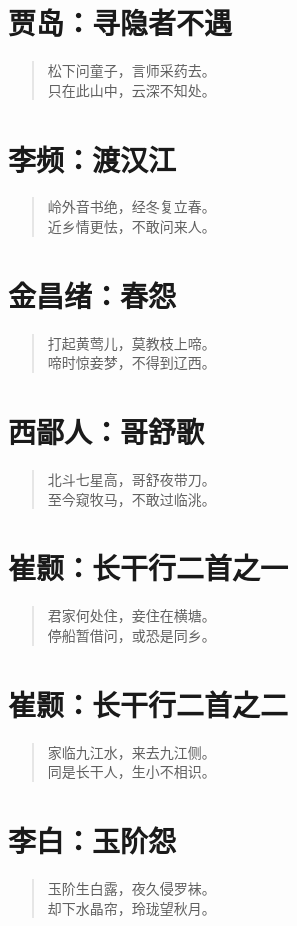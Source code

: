 \documentclass[12pt,oneside]{book}
\newenvironment{shici}{
\begin{verse}
\centering\large\hspace{12pt}}
{\end{verse}}
\begin{document}
\chapter{贾岛：寻隐者不遇}
\begin{shici}
松下问童子，言师采药去。\\
只在此山中，云深不知处。
\end{shici}

\chapter{李频：渡汉江}
\begin{shici}
岭外音书绝，经冬复立春。\\
近乡情更怯，不敢问来人。
\end{shici}

\chapter{金昌绪：春怨}
\begin{shici}
打起黄莺儿，莫教枝上啼。\\
啼时惊妾梦，不得到辽西。
\end{shici}

\chapter{西鄙人：哥舒歌}
\begin{shici}
北斗七星高，哥舒夜带刀。\\
至今窥牧马，不敢过临洮。
\end{shici}

\chapter{崔颢：长干行二首之一}
\begin{shici}
君家何处住，妾住在横塘。\\
停船暂借问，或恐是同乡。
\end{shici}

\chapter{崔颢：长干行二首之二}
\begin{shici}
家临九江水，来去九江侧。\\
同是长干人，生小不相识。
\end{shici}

\chapter{李白：玉阶怨}
\begin{shici}
玉阶生白露，夜久侵罗袜。\\
却下水晶帘，玲珑望秋月。
\end{shici}
\end{document}
